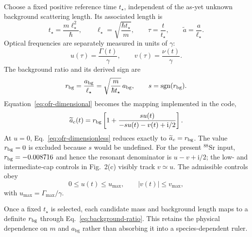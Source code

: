 \documentclass[9pt,a4paper,twocolumn,twoside]{rho-class/rho}
\newcommand{\abg}{a_{\mathrm{bg}}}
\newcommand{\ii}{\mathrm{i}}
\begin{document}
        Choose a fixed positive reference time $t_\star$, independent of the
        as-yet unknown background scattering length. Its associated length is
        \begin{equation}\label{eq:reference-scales}
            t_\star=\frac{m\ell_\star^2}{\hbar},\qquad
            \ell_\star=\sqrt{\frac{\hbar t_\star}{m}},\qquad
            \tau=\frac{t}{t_\star},\qquad
            \widetilde a=\frac{a}{\ell_\star}.
        \end{equation}
        Optical frequencies are separately measured in units of $\gamma$:
        \begin{equation}\label{eq:dimensionless-controls}
            u(\tau)=\frac{\Gamma(t)}{\gamma},\qquad
            v(\tau)=\frac{\nu(t)}{\gamma}.
        \end{equation}
        The background ratio and its derived sign are
        \begin{equation}\label{eq:background-ratio}
            r_{\rm bg}=\frac{\abg}{\ell_\star}
            =\sqrt{\frac{m}{\hbar t_\star}}\,\abg,
            \qquad s=\operatorname{sgn}(r_{\rm bg}).
        \end{equation}
        Equation~\eqref{eq:ofr-dimensional} becomes the mapping implemented in the code,
        \begin{equation}\label{eq:ofr-dimensionless}
            \widetilde a_c(t)
            =r_{\rm bg}\left[
                1+\frac{s u(t)}{-s u(t)-v(t)+\ii/2}
            \right].
        \end{equation}
        At $u=0$, Eq.~\eqref{eq:ofr-dimensionless} reduces exactly to
        $\widetilde a_c=r_{\rm bg}$. The value $r_{\rm bg}=0$ is excluded
        because $s$ would be undefined. For the present $^{88}\mathrm{Sr}$
        input, $r_{\rm bg}=-0.008716$ and hence the resonant denominator is
        $u-v+\ii/2$; the low- and intermediate-cap controls in Fig.~2(c)
        visibly track $v\simeq u$.
        The admissible controls obey
        \begin{equation}\label{eq:control-bounds}
            0\leq u(t)\leq u_{\max},\qquad
            |v(t)|\leq v_{\max},
        \end{equation}
        with $u_{\max}=\Gamma_{\max}/\gamma$.

        Once a fixed $t_\star$ is selected, each candidate mass and background
        length maps to a definite $r_{\rm bg}$ through
        Eq.~\eqref{eq:background-ratio}. This retains the physical dependence
        on $m$ and $\abg$ rather than absorbing it into a species-dependent
        ruler.
\end{document}
